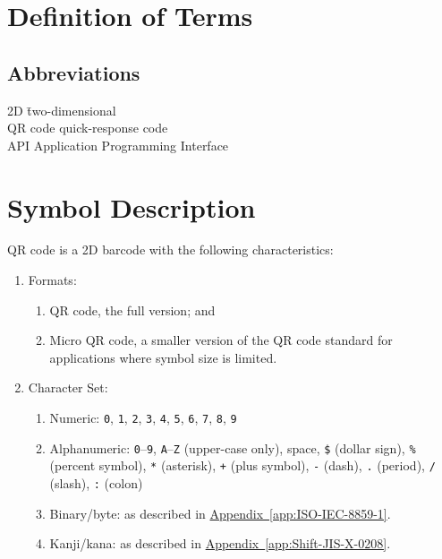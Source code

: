 \documentclass[../../2_specs]{subfiles}
\begin{document}
\section{Definition of Terms}

\subsection{Abbreviations}

\begin{tabbing}
  2D \hspace{3em} \= two-dimensional \parencite{mw-2d} \\
  QR code \> quick-response code \parencite{wikipedia-qr} \\
  API \> Application Programming Interface \parencite{wikipedia-api} \\
\end{tabbing}

\section{Symbol Description}

QR code is a 2D barcode with the following characteristics:

\begin{enumerate}
  \item Formats:
    \begin{enumerate}[label=\alph*.]
      \item QR code, the full version; and
      \item Micro QR code, a smaller version of the QR code standard for applications where symbol size is limited.
    \end{enumerate}
  \item Character Set\parencite{wikipedia-qr}:
    \begin{enumerate}[label=\alph*.]
      \item Numeric: \texttt{0}, \texttt{1}, \texttt{2}, \texttt{3}, \texttt{4}, \texttt{5}, \texttt{6}, \texttt{7}, \texttt{8}, \texttt{9}
      \item Alphanumeric: \texttt{0}--\texttt{9}, \texttt{A}--\texttt{Z} (upper-case only), space, \texttt{\$} (dollar sign), \texttt{\%} (percent symbol), \texttt{*} (asterisk), \texttt{+} (plus symbol), \texttt{-} (dash), \texttt{.} (period), \texttt{/} (slash), \texttt{:} (colon)
      \item Binary/byte:  as described in \hyperref[app:ISO-IEC-8859-1]{Appendix~\ref*{app:ISO-IEC-8859-1}}.
      \item Kanji/kana:  as described in \hyperref[app:Shift-JIS-X-0208]{Appendix~\ref*{app:Shift-JIS-X-0208}}.
    \end{enumerate}
\end{enumerate}
\end{document}

